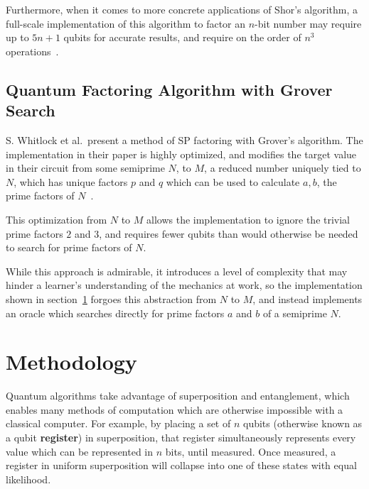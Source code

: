 \documentclass[twocolumn]{cinc}
\begin{document}
  Furthermore, when it comes to more concrete applications of Shor's algorithm,
  a full-scale implementation of this algorithm to factor an $n$-bit number
  may require up to $5n+1$ qubits for accurate results, and require 
  on the order of $n^3$ operations~\cite{quantum_fac_efficient}.

  \subsection{Quantum Factoring Algorithm with Grover Search}

  S. Whitlock et al.\ present a method of SP factoring with Grover's
  algorithm. The implementation in their paper is highly optimized,
  and modifies the target value in their circuit from some semiprime $N$,
  to $M$, a reduced number uniquely tied to $N$, which has unique factors 
  $p$ and $q$ which can be used to calculate $a, b$, the prime factors of 
  $N$~\cite{quantum_factoring}. 
  
  This optimization from $N$ to $M$ allows the implementation to ignore
  the trivial prime factors $2$ and $3$, and requires fewer qubits than would
  otherwise be needed to search for prime factors of $N$.

  While this approach is admirable, it introduces a level of complexity 
  that may hinder a learner's understanding of the mechanics at work,
  so the implementation shown in section\ \ref{sec:Methodology} forgoes
  this abstraction from $N$ to $M$, and instead implements an oracle which
  searches directly for prime factors $a$ and $b$ of a semiprime $N$.

\section{Methodology}\label{sec:Methodology}

Quantum algorithms take advantage of superposition and entanglement,
which enables many methods of computation which are otherwise impossible
with a classical computer. For example, by placing a set of $n$ qubits 
(otherwise known as a qubit \textbf{register}) in superposition, that register
simultaneously represents every value which can be represented in $n$ bits,
until measured. Once measured, a register in uniform superposition will 
collapse into one of these states with equal likelihood.

%
\end{document}
